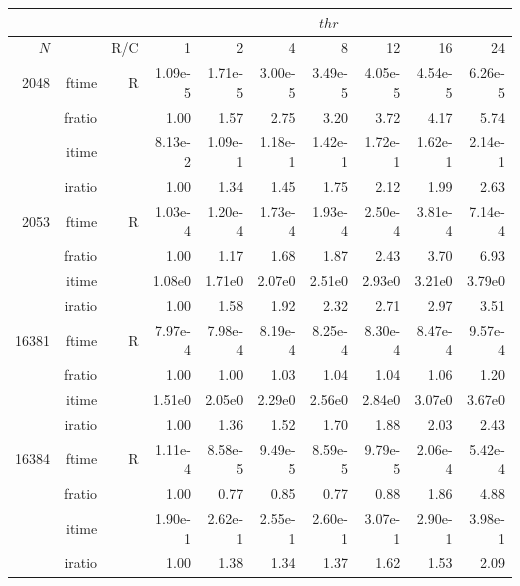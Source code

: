 \documentclass[a4paper]{article}
\begin{document}
\begin{table}
\begin{center}
\begin{tabular}{|r|r|r|r|r|r|r|r|r|r|}
\hline 
     \multicolumn{3}{|c|}{ } & \multicolumn{7}{c|}{$thr$} \\ \hline
    $N$  & & R/C  & 1           & 2    & 4    & 8    & 12   & 16    & 24  \\ \hline\hline
    2048  & ftime & R  &  1.09e-5 &   1.71e-5 &   3.00e-5 &   3.49e-5 &   4.05e-5 &   4.54e-5 &   6.26e-5   \\ 
      & fratio & & 1.00 &    1.57 &    2.75 &    3.20 &    3.72 &    4.17 &    5.74   \\ 
     & itime & &  8.13e-2 &    1.09e-1 &   1.18e-1 &   1.42e-1 &   1.72e-1 &   1.62e-1 &   2.14e-1    \\ 
     & iratio & &   1.00 &    1.34 &    1.45 &    1.75 &    2.12 &    1.99 &    2.63    \\ \hline 
    2053  & ftime & R &  1.03e-4 &   1.20e-4 &   1.73e-4 &   1.93e-4 &   2.50e-4 &   3.81e-4 &   7.14e-4    \\ 
      & fratio & & 1.00 &   1.17 &   1.68 &   1.87 &   2.43 &   3.70 &   6.93    \\ 
     & itime &  &   1.08e0 &   1.71e0 &   2.07e0 &   2.51e0 &   2.93e0 &   3.21e0 &   3.79e0   \\ 
    & iratio &  &     1.00 &   1.58 &   1.92 &   2.32 &   2.71 &   2.97 &   3.51     \\ \hline 
  16381  & ftime & R &  7.97e-4 &   7.98e-4 &   8.19e-4 &   8.25e-4 &   8.30e-4 &   8.47e-4 &   9.57e-4     \\ 
      & fratio & &  1.00 &   1.00 &   1.03 &   1.04 &   1.04 &   1.06 &   1.20    \\ 
     & itime & &  1.51e0 &   2.05e0 &   2.29e0 &   2.56e0 &   2.84e0 &   3.07e0 &   3.67e0     \\ 
     & iratio & &  1.00 &   1.36 &   1.52 &   1.70 &   1.88 &   2.03 &   2.43     \\ \hline 
 16384  & ftime & R & 1.11e-4 &   8.58e-5 &   9.49e-5 &   8.59e-5 &   9.79e-5 &   2.06e-4 &   5.42e-4   \\ 
      & fratio & & 1.00 &   0.77 &   0.85 &   0.77 &   0.88 &   1.86 &   4.88  \\
     & itime & & 1.90e-1 &   2.62e-1 &   2.55e-1 &   2.60e-1 &   3.07e-1 &   2.90e-1 &   3.98e-1   \\ 
 & iratio & & 1.00 &   1.38 &   1.34 &   1.37 &   1.62 &   1.53 &   2.09   \\  \hline \hline

\end{tabular}
\end{center}
\end{table}
\end{document}

